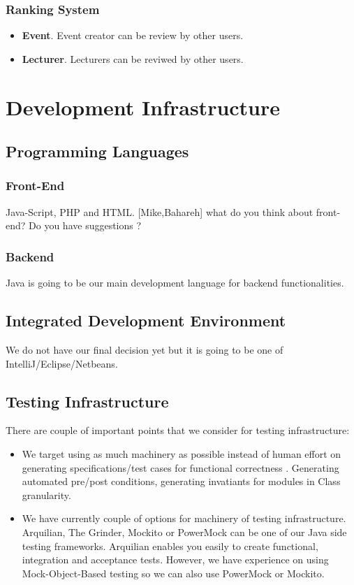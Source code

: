  \subsubsection{Ranking System}
  \begin{itemize}
 \item \textbf{Event}. Event creator can be review by other users.
 \item \textbf{Lecturer}. Lecturers can be reviwed by other users.
  \end{itemize}
\section{Development Infrastructure}
\subsection{Programming Languages}
\subsubsection{Front-End} Java-Script, PHP and HTML. [Mike,Bahareh] what do you think about front-end? Do you have suggestions ?
\subsubsection{Backend} Java is going to be our main development language for backend functionalities. 
 \subsection{Integrated Development Environment} We do not have our final decision yet but it is going to be one of IntelliJ/Eclipse/Netbeans. 
 \subsection{Testing Infrastructure} There are couple of important points that we consider for testing infrastructure:
 \begin{itemize}
 \item We target using as much machinery as possible instead of human effort on generating specifications/test cases for functional correctness . Generating automated pre/post conditions, generating invatiants for modules in Class granularity.
   \item We have currently couple of options for machinery of testing infrastructure. Arquilian, The Grinder, Mockito or PowerMock can be one of our Java side testing frameworks. Arquilian enables you easily to create functional, integration and acceptance tests. However, we have experience on using Mock-Object-Based testing so we can also use PowerMock or Mockito.   
 \end{itemize}
